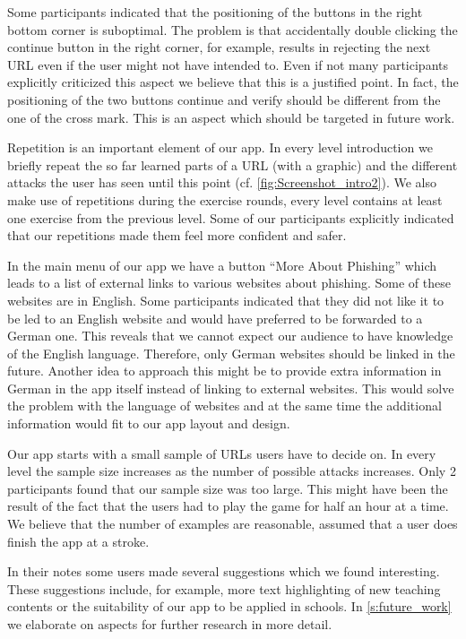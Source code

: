 \begin{description}[leftmargin=0cm]
Some participants indicated that the positioning of the buttons in the right bottom corner is suboptimal.
The problem is that accidentally double clicking the continue button in the right corner, for example, results in rejecting the next URL even if the user might not have intended to.
Even if not many participants explicitly criticized this aspect we believe that this is a justified point.
In fact, the positioning of the two buttons continue and verify should be different from the one of the cross mark.
This is an aspect which should be targeted in future work. 
	\item[Repetition:]
Repetition is an important element of our app.
In every level introduction we briefly repeat the so far learned parts of a URL (with a graphic) and the different attacks the user has seen until this point (cf. \autoref{fig:Screenshot_intro2}).
We also make use of repetitions during the exercise rounds, every level contains at least one exercise from the previous level.
Some of our participants explicitly indicated that our repetitions made them feel more confident and safer.
	\item[External Links:]
In the main menu of our app we have a button ``More About Phishing'' which leads to a list of external links to various websites about phishing.
Some of these websites are in English.
Some participants indicated that they did not like it to be led to an English website and would have preferred to be forwarded to a German one.
This reveals that we cannot expect our audience to have knowledge of the English language.
Therefore, only German websites should be linked in the future.
Another idea to approach this might be to provide extra information in German in the app itself instead of linking to external websites.
This would solve the problem with the language of websites and at the same time the additional information would fit to our app layout and design.
	\item[Amount of Examples:] Our app starts with a small sample of URLs users have to decide on.
In every level the sample size increases as the number of possible attacks increases.
Only 2 participants found that our sample size was too large.
This might have been the result of the fact that the users had to play the game for half an hour at a time.
We believe that the number of examples are reasonable, assumed that a user does finish the app at a stroke.
	\item[Further Suggestions:] In their notes some users made several suggestions which we found interesting.
These suggestions include, for example, more text highlighting of new teaching contents or the suitability of our app to be applied in schools.
In \autoref{s:future_work} we elaborate on aspects for further research in more detail.
\end{description}


